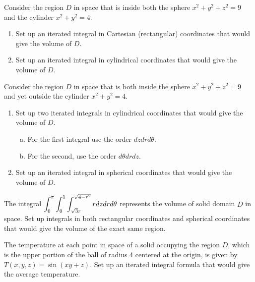 \begin{problem}
Consider the region $D$ in space that is inside both the sphere $x^2+y^2+z^2=9$ and the cylinder $x^2+y^2=4$.
\begin{enumerate}
 \item Set up an iterated integral in Cartesian (rectangular) coordinates that would give the volume of $D$. 
 \item Set up an iterated integral in cylindrical coordinates that would give the volume of $D$. 
\end{enumerate}
\end{problem}

\begin{problem}
Consider the region $D$ in space that is both inside the sphere $x^2+y^2+z^2=9$ and yet outside the cylinder $x^2+y^2=4$. 
\begin{enumerate}
 \item Set up two iterated integrals in cylindrical coordinates that would give the volume of $D$. 
	\begin{enumerate}[a)]
		\item For the first integral use the order $dzdrd\theta$.  
		\item For the second, use the order $d\theta dr dz$.
	\end{enumerate}
 \item Set up an iterated integral in spherical coordinates that would give the volume of $D$. 
\end{enumerate}
\end{problem}



\begin{problem}
The integral $\displaystyle\int_{0}^{\pi}\int_{0}^{1}\int_{\sqrt{3}r}^{\sqrt{4-r^2}}rdzdrd\theta$ represents the volume of solid domain $D$ in space. Set up integrals in both rectangular coordinates and spherical coordinates that would give the volume of the exact same region.
\end{problem}

\begin{problem}
The temperature at each point in space of a solid occupying the region {$D$}, which is the upper portion of the ball of radius 4 centered at the origin, is given by $T(x,y,z) = \sin(xy+z)$.  Set up an iterated integral formula that would give the average temperature.   
\end{problem}




